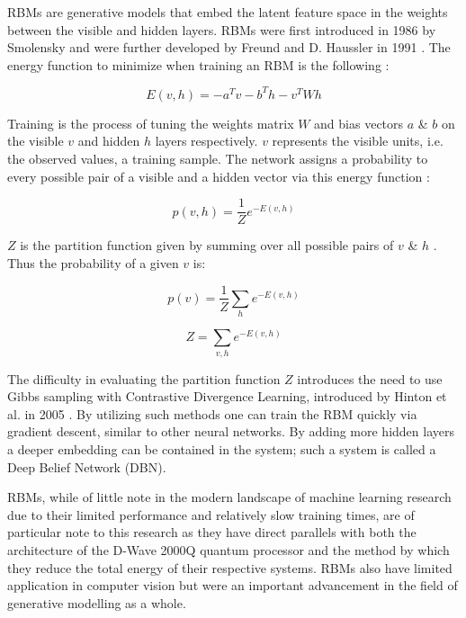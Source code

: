 \documentclass[%
 reprint,
 amsmath,amssymb,
 aps,
]{revtex4-2}
\begin{document}
RBMs are generative models that embed the latent feature space in the weights between the visible and hidden layers. RBMs were first introduced in 1986 by Smolensky and were further developed by Freund and D. Haussler in 1991 \cite{Smolensky1986InformationPI} \cite{NIPS1991_33e8075e}. The energy function to minimize when training an RBM is the following \cite{hopfield}:

\begin{equation}
E(v, h) = -a^Tv -b^Th -v^TWh
\label{eq:rbmEnergy}
\end{equation}



Training is the process of tuning the weights matrix $W$ and bias vectors $a$ \& $b$ on the visible $v$ and hidden $h$ layers respectively. $v$ represents the visible units, i.e. the observed values, a training sample. The network assigns a probability to every possible pair of a visible and a hidden vector via this energy function \cite{Hinton2012}:

\begin{equation}
p(v, h) = \frac{1}{Z}e^{-E(v,h)}
\end{equation}



$Z$ is the partition function given by summing over all possible pairs of $v$ \& $h$ \cite{Hinton2012}. Thus the probability of a given $v$ is:

\begin{equation}
p(v) = \frac{1}{Z}\sum_{h} e^{-E(v,h)}
\end{equation}

\begin{equation}
Z = \sum_{v,h}e^{-E(v,h)}
\end{equation}



The difficulty in evaluating the partition function $Z$ introduces the need to use Gibbs sampling with Contrastive Divergence Learning, introduced by Hinton et al. in 2005 \cite{CarreiraPerpin2005OnCD}. By utilizing such methods one can train the RBM quickly via gradient descent, similar to other neural networks. By adding more hidden layers a deeper embedding can be contained in the system; such a system is called a Deep Belief Network (DBN).


RBMs, while of little note in the modern landscape of machine learning research due to their limited performance and relatively slow training times, are of particular note to this research as they have direct parallels with both the architecture of the D-Wave 2000Q quantum processor and the method by which they reduce the total energy of their respective systems. RBMs also have limited application in computer vision but were an important advancement in the field of generative modelling as a whole.
\end{document}
